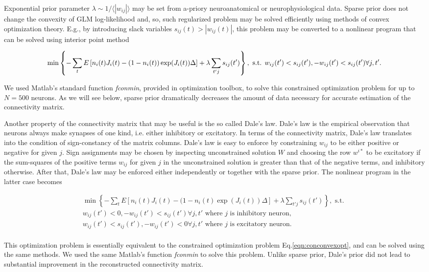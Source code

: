 Exponential prior parameter $\lambda\sim 1/\langle|w_{ij}|\rangle$ may be set from a-priory neuroanatomical or neurophysiological data. Sparse prior does not change the convexity of GLM log-likelihood and, so, such regularized problem may be solved efficiently using methods of convex optimization theory. E.g., by introducing slack variables $s_{ij}(t)>|w_{ij}(t)|$, this problem may be converted to a nonlinear program that can be solved using interior point method

\begin{equation} \label{eqn:conconvexopt}
\min \left\{-\sum\limits_t E\left[ n_i(t) J_i(t) - (1-n_i(t)) \exp(J_i(t)) \Delta \right]+\lambda \sum\limits_{t'j}s_{ij}(t')\right\}, \text{ s.t. } \\
w_{ij}(t')<s_{ij}(t'), -w_{ij}(t')<s_{ij}(t') \forall j, t'.
\end{equation}

We used Matlab's standard function {\em fconmin}, provided in optimization toolbox, to solve this constrained optimization problem for up to $N=500$ neurons. As we will see below, sparse prior dramatically decreases the amount of data necessary for accurate estimation of the connectivity matrix.

Another property of the connectivity matrix that may be useful is the so called Dale's law. Dale's law is the empirical observation that neurons always make synapses of one kind, i.e. either inhibitory or excitatory. In terms of the connectivity matrix, Dale's law translates into the condition of sign-constancy of the matrix columns. Dale's law is easy to enforce by constraining $w_{ij}$ to be either positive or negative for given $j$.  Sign assignments may be chosen by inspecting unconstrained solution $W$ and choosing the row $w^{i*}$ to be excitatory if the sum-squares of the positive terms $w_{ij}$ for given $j$ in the unconstrained solution is greater than that of the negative terms, and inhibitory otherwise.  After that, Dale's law may be enforced either independently or together with the sparse prior.  The nonlinear program in the latter case becomes

\begin{equation}
\begin{array}{l}
\min \left\{-\sum\limits_t E\left[ n_i(t) J_i(t) - (1-n_i(t) \exp(J_i(t)) \Delta \right]+\lambda \sum\limits_{t'j}s_{ij}(t')\right\}, \text{ s.t. }\\
w_{ij}(t')<0, -w_{ij}(t')<s_{ij}(t') \forall j, t'\text{ where }j\text{ is inhibitory neuron}, \\
w_{ij}(t')<s_{ij}(t'), -w_{ij}(t')<0 \forall j, t'\text{ where }j\text{ is excitatory neuron}. \\
\end{array}
\end{equation}

This optimization problem is essentially equivalent to the constrained optimization problem Eq.\eqref{eqn:conconvexopt}, and can be solved using the same methods. We used the same Matlab's function {\em fconmin} to solve this problem. Unlike sparse prior, Dale's prior did not lead to substantial improvement in the reconstructed connectivity matrix.
